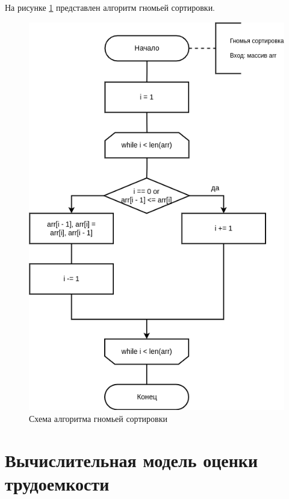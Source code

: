 На рисунке \ref{img:gnome_sort} представлен алгоритм гномьей сортировки.

\begin{figure}[H]
	\begin{center}
		\includegraphics[scale=0.8]{img/gnome_sort.png}
	\end{center}
	\captionsetup{justification=centering}
	\caption{Схема алгоритма гномьей сортировки}
	\label{img:gnome_sort}
\end{figure}

\section{Вычислительная модель оценки трудоемкости}

